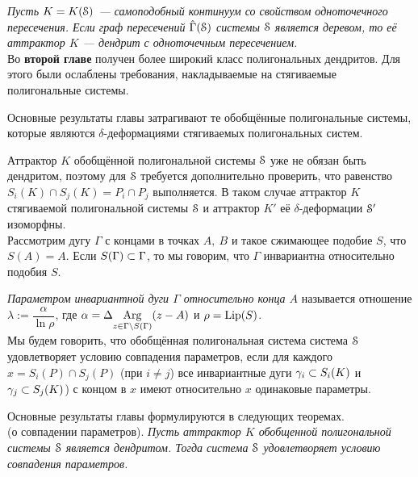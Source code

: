 {\em Пусть $K=K({\EuScript S})$ --- самоподобный континуум со свойством одноточечного пересечения.
Если граф пересечений $\hat\Gamma({\EuScript S})$ системы ${\EuScript S}$ является деревом, то её аттрактор $K$ --- дендрит с одноточечным пересечением.}\\



Во \textbf{второй главе} получен более широкий класс полигональных дендритов. 
Для этого были ослаблены требования, накладываемые на стягиваемые полигональные системы.


Основные результаты главы затрагивают те обобщённые полигональные системы, которые являются $\delta$-деформациями стягиваемых полигональных систем.


Аттрактор $K$ обобщённой полигональной системы ${\EuScript S}$ уже не обязан быть дендритом, поэтому  для ${\EuScript S}$ требуется дополнительно проверить, что равенство $S_i(K)\cap S_j(K)=P_i\cap P_j$ выполняется.
В таком случае аттрактор $K$ стягиваемой полигональной системы ${\EuScript S}$ и аттрактор $K'$ её $\delta$-деформации ${\EuScript S}'$ изоморфны.\\

Рассмотрим дугу  $\Gamma$ с концами в точках $A,\ B$ и такое сжимающее подобие $S$, что $S(A)=A$.
Если $S(\Gamma)\subset\Gamma$, то мы говорим, что $\Gamma$ инвариантна относительно подобия $S$.

{\em Параметром инвариантной дуги $\Gamma$ относительно конца $A$} называется отношение $\lambda:=\dfrac{\alpha}{\ln\rho}$, где $\alpha=\Delta\underset{{z\in\Gamma\setminus S(\Gamma)}}{\mathrm {Arg}}(z-A)$ и $\rho=\mathop{\rm Lip} \nolimits(S)$.\\

Мы будем говорить, что обобщённая полигональная система система ${\EuScript S}$ удовлетворяет условию совпадения параметров, если для каждого \linebreak $x=S_i(P)\cap S_j(P)$ (при $i\neq j$) все инвариантные дуги $\gamma_i\subset S_i(K)$ и $\gamma_j\subset S_j(K)$) с концом в $x$ имеют относительно $x$ одинаковые параметры.

Основные результаты главы формулируются в следующих теоремах.\\

 (о совпадении параметров). 
{\em
Пусть аттрактор $K$ обобщенной полигональной системы ${\EuScript S}$ является дендритом. 
Тогда система ${\EuScript S}$ удовлетворяет условию совпадения параметров.}\\

